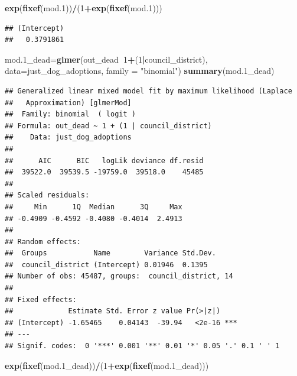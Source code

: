 \documentclass[]{article}
\newenvironment{Shaded}{\begin{snugshade}}{\end{snugshade}}
\newcommand{\KeywordTok}[1]{\textcolor[rgb]{0.13,0.29,0.53}{\textbf{#1}}}
\newcommand{\DataTypeTok}[1]{\textcolor[rgb]{0.13,0.29,0.53}{#1}}
\newcommand{\DecValTok}[1]{\textcolor[rgb]{0.00,0.00,0.81}{#1}}
\newcommand{\StringTok}[1]{\textcolor[rgb]{0.31,0.60,0.02}{#1}}
\newcommand{\OperatorTok}[1]{\textcolor[rgb]{0.81,0.36,0.00}{\textbf{#1}}}
\newcommand{\NormalTok}[1]{#1}
\begin{document}
\begin{Shaded}
\begin{Highlighting}[]
\KeywordTok{exp}\NormalTok{(}\KeywordTok{fixef}\NormalTok{(mod.}\DecValTok{1}\NormalTok{))}\OperatorTok{/}\NormalTok{(}\DecValTok{1}\OperatorTok{+}\KeywordTok{exp}\NormalTok{(}\KeywordTok{fixef}\NormalTok{(mod.}\DecValTok{1}\NormalTok{)))}
\end{Highlighting}
\end{Shaded}

\begin{verbatim}
## (Intercept) 
##   0.3791861
\end{verbatim}

\begin{Shaded}
\begin{Highlighting}[]
\NormalTok{mod.1_dead=}\KeywordTok{glmer}\NormalTok{(out_dead}\OperatorTok{~}\DecValTok{1}\OperatorTok{+}\NormalTok{(}\DecValTok{1}\OperatorTok{|}\NormalTok{council_district), }\DataTypeTok{data=}\NormalTok{just_dog_adoptions, }\DataTypeTok{family =} \StringTok{"binomial"}\NormalTok{)}
\KeywordTok{summary}\NormalTok{(mod.1_dead)}
\end{Highlighting}
\end{Shaded}

\begin{verbatim}
## Generalized linear mixed model fit by maximum likelihood (Laplace
##   Approximation) [glmerMod]
##  Family: binomial  ( logit )
## Formula: out_dead ~ 1 + (1 | council_district)
##    Data: just_dog_adoptions
## 
##      AIC      BIC   logLik deviance df.resid 
##  39522.0  39539.5 -19759.0  39518.0    45485 
## 
## Scaled residuals: 
##     Min      1Q  Median      3Q     Max 
## -0.4909 -0.4592 -0.4080 -0.4014  2.4913 
## 
## Random effects:
##  Groups           Name        Variance Std.Dev.
##  council_district (Intercept) 0.01946  0.1395  
## Number of obs: 45487, groups:  council_district, 14
## 
## Fixed effects:
##             Estimate Std. Error z value Pr(>|z|)    
## (Intercept) -1.65465    0.04143  -39.94   <2e-16 ***
## ---
## Signif. codes:  0 '***' 0.001 '**' 0.01 '*' 0.05 '.' 0.1 ' ' 1
\end{verbatim}

\begin{Shaded}
\begin{Highlighting}[]
\KeywordTok{exp}\NormalTok{(}\KeywordTok{fixef}\NormalTok{(mod.1_dead))}\OperatorTok{/}\NormalTok{(}\DecValTok{1}\OperatorTok{+}\KeywordTok{exp}\NormalTok{(}\KeywordTok{fixef}\NormalTok{(mod.1_dead)))}
\end{Highlighting}
\end{Shaded}
\end{document}

